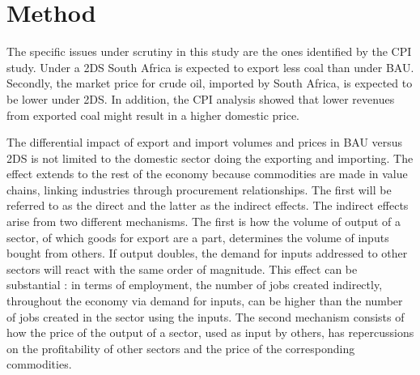 \documentclass[12pt,english]{article}
\begin{document}
\section{Method}

The specific issues under scrutiny in this study are the ones identified by the CPI study. Under a 2DS South Africa is expected to export less coal than under BAU. Secondly, the market price for crude oil, imported by South Africa, is expected to be lower under 2DS. In addition, the CPI analysis showed that lower revenues from exported coal might result in a higher domestic price. %


The differential impact of export and import volumes and prices in BAU versus 2DS is not limited to %
the domestic sector doing the exporting and importing. The effect extends to the rest of the economy because commodities are made in value chains, linking industries through procurement %
relationships. The first will be referred to as the direct and the latter as the indirect effects. The indirect effects arise from two different mechanisms. The first is how the volume of output of a sector, of which goods for export are a part, determines the volume of inputs bought from others. %
If output doubles,  %
the demand for inputs addressed to other sectors will react with the same order of magnitude. This effect can be substantial : in terms of employment, the number of jobs created indirectly, throughout the economy via demand for inputs, can be higher than the number of jobs created in the sector using the inputs. The second mechanism consists of how the price of the output of a sector, used as input by others, has repercussions on the profitability of other sectors and the price of the corresponding commodities. 
\end{document}
